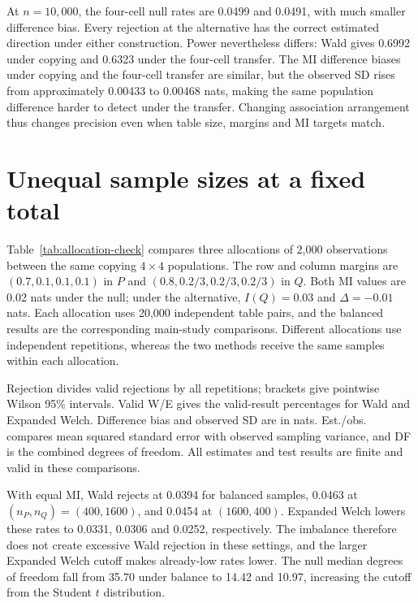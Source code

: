 At \(n=10{,}000\), the four-cell null rates are 0.0499 and 0.0491,
with much smaller difference bias. Every rejection at the alternative
has the correct estimated direction under either construction.
Power nevertheless differs: Wald gives 0.6992 under copying and
0.6323 under the four-cell transfer. The MI difference biases under
copying and the four-cell transfer are similar, but the
observed SD rises from approximately 0.00433 to 0.00468 nats, making
the same population difference harder to detect under the transfer.
Changing association arrangement thus changes precision even when
table size, margins and MI targets match.

\section{Unequal sample sizes at a fixed total}
\label{sec:allocation-check}

Table~\ref{tab:allocation-check} compares three allocations of 2,000
observations between the same copying \(4\times4\) populations.
The row and column margins are \((0.7,0.1,0.1,0.1)\) in \(P\) and
\((0.8,0.2/3,0.2/3,0.2/3)\) in \(Q\). Both MI values are 0.02 nats
under the null; under the alternative, \(I(Q)=0.03\) and
\(\Delta=-0.01\) nats. Each allocation uses 20,000 independent
table pairs, and the balanced results are the corresponding main-study
comparisons. Different allocations use independent repetitions, whereas
the two methods receive the same samples within each allocation.

Rejection divides valid rejections by all repetitions; brackets give
pointwise Wilson 95\% intervals. Valid W/E gives the valid-result
percentages for Wald and Expanded Welch. Difference bias and observed
SD are in nats. Est./obs. compares mean squared standard error with
observed sampling variance, and DF is the combined degrees of freedom.
All estimates and test results are finite and valid in these comparisons.

\begin{table}[H]
\centering
\small
\caption{Rejection and estimation diagnostics at fixed total sample size.}
\label{tab:allocation-check}

\end{table}

With equal MI, Wald rejects at 0.0394 for balanced samples, 0.0463 at
\((n_P,n_Q)=(400,1600)\), and 0.0454 at \((1600,400)\). Expanded Welch lowers these
rates to 0.0331, 0.0306 and 0.0252, respectively. The imbalance therefore
does not create excessive Wald rejection in these settings, and the
larger Expanded Welch cutoff makes already-low rates lower. The null median
degrees of freedom fall from 35.70 under balance to 14.42 and 10.97, increasing the
cutoff from the Student \(t\) distribution.

